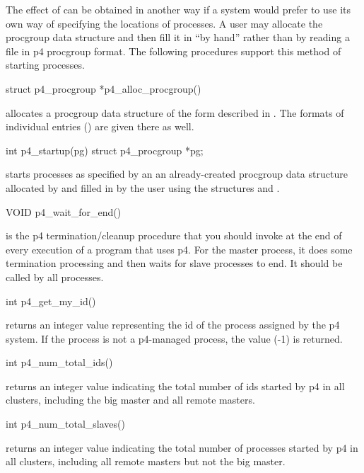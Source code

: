The effect of  can be obtained in another way if a
system would prefer to use its own way of specifying the locations of
processes.  A user may allocate the procgroup data structure and then fill it
in ``by hand'' rather than by reading a file in p4 procgroup format.  The
following procedures support this method of starting processes.

\begin{example}
struct p4_procgroup *p4_alloc_procgroup()
\end{example}
\noindent
allocates a procgroup data structure of the form described in .
The formats of individual entries () are given there
as well. 

\begin{example}
int p4_startup(pg)
struct p4_procgroup *pg;
\end{example}
\noindent
starts processes as specified by an an already-created procgroup data
structure allocated by  and filled in by the user
using the structures  and .


\begin{example}
VOID p4_wait_for_end()
\end{example}
\noindent
is the p4 termination/cleanup procedure that you should invoke at
the end of every execution of a program that uses p4.  For the master process,
it does some termination processing and then waits for slave processes to end.
It should be called by all processes.

\begin{example}
int p4_get_my_id()
\end{example}
\noindent
returns an integer value representing the id of the process assigned by
the p4 system.  If the process is not a p4-managed process, the value
(-1) is returned.

\begin{example}
int p4_num_total_ids()
\end{example}
\noindent
returns an integer value indicating the total number of ids started
by p4 in all clusters, including the big master and all remote masters.

\begin{example}
int p4_num_total_slaves()
\end{example}
\noindent
returns an integer value indicating the total number of processes started
by p4 in all clusters, including all remote masters but not the big master.


